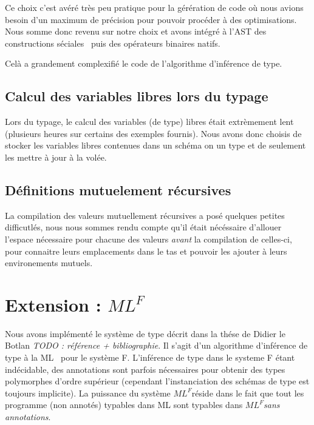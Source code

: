 \documentclass[a4paper]{article}
\def\mlf{$ML^F$}
\begin{document}
Ce choix c'est avéré très peu pratique pour la gérération de code où
nous avions besoin d'un maximum de précision pour pouvoir procéder à
des optimisations. Nous somme donc revenu sur notre choix et avons
intégré à l'AST des \og constructions séciales \fg~puis des opérateurs
binaires natifs.

Celà a grandement complexifié le code de l'algorithme d'inférence de type.

\subsection{Calcul des variables libres lors du typage}

Lors du typage, le calcul des variables (de type) libres était
extrèmement lent (plusieurs heures sur certains des exemples fournis).
Nous avons donc choisis de stocker les variables libres contenues dans
un schéma on un type et de seulement les mettre à jour à la volée.


\subsection{Définitions mutuelement récursives}

La compilation des valeurs mutuellement récursives a posé quelques
petites difficutlés, nous nous sommes rendu compte qu'il était
nécéssaire d'allouer l'espace nécessaire pour chacune des valeurs
\emph{avant} la compilation de celles-ci, pour connaitre leurs
emplacements dans le tas et pouvoir les ajouter à leurs environements
mutuels.

\section{Extension : \mlf}
Nous avons implémenté le système de type décrit dans la thése de
Didier le Botlan \textit{TODO : référence + bibliographie}. Il s'agit
d'un algorithme d'inférence de type \og à la ML \fg~pour le système F.
L'inférence de type dans le systeme F étant indécidable, des
annotations sont parfois nécessaires pour obtenir des types polymorphes
d'ordre supérieur (cependant l'instanciation des schémas de type est
toujours implicite). La puissance du système \mlf réside dans le fait
que tout les programme (non annotés) typables dans ML sont typables
dans \mlf \emph{sans annotations}.
\end{document}
